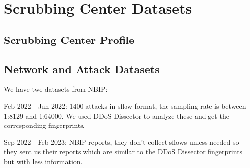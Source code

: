 \section{Scrubbing Center Datasets}\label{sec:datasets}


\subsection{Scrubbing Center Profile}


\subsection{Network and Attack Datasets}

We have two datasets from NBIP:

Feb 2022 - Jun 2022: 1400 attacks in sflow format, the sampling rate is between 1:8129 and 1:64000. We used DDoS Dissector to analyze these and get the corresponding fingerprints.


Sep 2022 - Feb 2023: NBIP reports, they don't collect sflows unless needed so they sent us their reports which are similar to the DDoS Dissector fingerprints but with less information.




